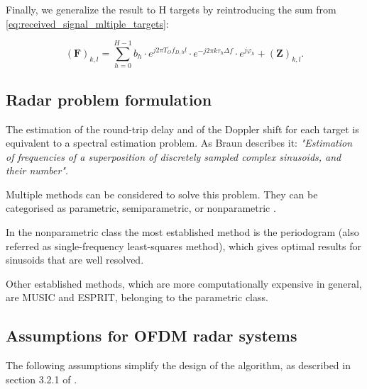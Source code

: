     Finally, we generalize the result to H targets by reintroducing the sum from \ref{eq:received_signal_mltiple_targets}:
    
    \begin{equation}
        (\mathbf F)_{k,l} =  \sum_{h=0}^{H-1} b_h \cdot e^{j2\pi T_O f_{D,h} l}\cdot e^{-j2\pi k \tau_h \Delta f} \cdot e^{j\varphi_h} + (\mathbf{Z})_{k,l}.
    \end{equation}
    
    \subsection{Radar problem formulation}
    
    The estimation of the round-trip delay and of the Doppler shift for each target is equivalent to a spectral estimation problem. As Braun describes it: \textit{"Estimation of frequencies of a superposition of discretely sampled complex sinusoids, and their number"}.
    
    Multiple methods can be considered to solve this problem. They can be categorised as parametric, semiparametric, or nonparametric \cite{Stoica_New_Method_Parameter_Estimation}. 
    
    In the nonparametric class the most established method is the periodogram (also referred as single-frequency least-squares method), which gives optimal results for sinusoids that are well resolved.
    
    Other established methods, which are more computationally expensive in general, are MUSIC and ESPRIT, belonging to the parametric class.
    
    \subsection{Assumptions for OFDM radar systems}
    \label{sub:assumptions_ofdm_radar}
    The following assumptions simplify the design of the algorithm, as described in section 3.2.1 of \cite{Braun2014OFDMRA}.
    

